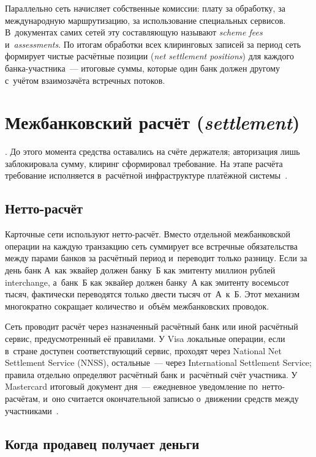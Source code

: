 Параллельно сеть начисляет собственные комиссии: плату за обработку, за
международную маршрутизацию, за использование специальных сервисов.
В~документах самих сетей эту составляющую называют \textit{scheme fees}
и~\textit{assessments}. По итогам обработки всех клиринговых записей за период
сеть формирует чистые расчётные позиции (\textit{net settlement positions}) для
каждого банка-участника~---
итоговые суммы, которые один банк должен другому с~учётом взаимозачёта
встречных потоков.

\section{Межбанковский расчёт (\textit{settlement})}\label{sec:tx-settlement}

. До этого момента средства оставались на счёте
держателя; авторизация лишь заблокировала сумму, клиринг сформировал требование. На этапе
расчёта требование исполняется в~расчётной инфраструктуре платёжной
системы~\cite{fz-161,visa-core-rules,mc-tpr}.

\subsection*{Нетто-расчёт}

Карточные сети используют нетто-расчёт. Вместо отдельной межбанковской операции
на каждую транзакцию сеть суммирует все встречные обязательства между парами
банков за расчётный период и~переводит только разницу. Если за день банк А~как
эквайер должен банку~Б как эмитенту миллион рублей interchange, а~банк~Б как
эквайер должен банку~А как эмитенту восемьсот тысяч, фактически переводятся
только двести тысяч от~А~к~Б. Этот механизм многократно сокращает количество
и~объём межбанковских проводок.

Сеть проводит расчёт через назначенный расчётный банк или иной расчётный
сервис, предусмотренный её правилами. У Visa локальные операции, если в~стране
доступен соответствующий сервис, проходят через National Net Settlement Service
(NNSS), остальные~--- через International Settlement Service; правила отдельно
определяют расчётный банк и~расчётный счёт участника. У Mastercard итоговый
документ дня~--- ежедневное уведомление по~нетто-расчётам, и~оно считается
окончательной записью о~движении средств между
участниками~\cite{visa-core-rules,mc-tpr}.

\subsection*{Когда продавец получает деньги}


